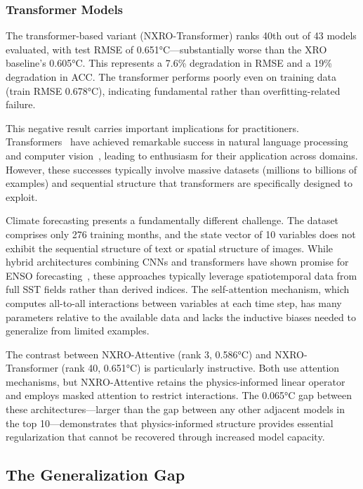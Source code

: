 \subsubsection{Transformer Models}

The transformer-based variant (NXRO-Transformer) ranks 40th out of 43 models evaluated, with test RMSE of 0.651°C---substantially worse than the XRO baseline's 0.605°C. This represents a 7.6\% degradation in RMSE and a 19\% degradation in ACC. The transformer performs poorly even on training data (train RMSE 0.678°C), indicating fundamental rather than overfitting-related failure.

This negative result carries important implications for practitioners. Transformers~\cite{vaswani2017attention} have achieved remarkable success in natural language processing and computer vision~\cite{dosovitskiy2020image}, leading to enthusiasm for their application across domains. However, these successes typically involve massive datasets (millions to billions of examples) and sequential structure that transformers are specifically designed to exploit.

Climate forecasting presents a fundamentally different challenge. The dataset comprises only 276 training months, and the state vector of 10 variables does not exhibit the sequential structure of text or spatial structure of images. While hybrid architectures combining CNNs and transformers have shown promise for ENSO forecasting~\cite{lyu2024resonet,patil2023deep}, these approaches typically leverage spatiotemporal data from full SST fields rather than derived indices. The self-attention mechanism, which computes all-to-all interactions between variables at each time step, has many parameters relative to the available data and lacks the inductive biases needed to generalize from limited examples.

The contrast between NXRO-Attentive (rank 3, 0.586°C) and NXRO-Transformer (rank 40, 0.651°C) is particularly instructive. Both use attention mechanisms, but NXRO-Attentive retains the physics-informed linear operator and employs masked attention to restrict interactions. The 0.065°C gap between these architectures---larger than the gap between any other adjacent models in the top 10---demonstrates that physics-informed structure provides essential regularization that cannot be recovered through increased model capacity.

\subsection{The Generalization Gap}

